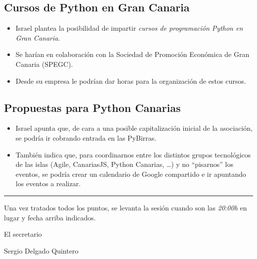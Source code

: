 \documentclass[a4paper, 12pt]{article}
\begin{document}
\subsection*{Cursos de Python en Gran Canaria}

\begin{itemize}
    \item Israel plantea la posibilidad de impartir \textit{cursos de programación Python en Gran Canaria}.
    \item Se harían en colaboración con la Sociedad de Promoción Económica de Gran Canaria (SPEGC).
    \item Desde su empresa le podrían dar horas para la organización de estos cursos.
\end{itemize}

\subsection*{Propuestas para Python Canarias}

\begin{itemize}
    \item Israel apunta que, de cara a una posible capitalización inicial de la asociación, se podría ir cobrando entrada en las PyBirras.
    \item También indica que, para coordinarnos entre los distintos grupos tecnológicos de las islas (Agile, CanariasJS, Python Canarias, \ldots) y no ``pisarnos'' los eventos, se podría crear un calendario de Google compartido e ir apuntando los eventos a realizar.
\end{itemize}



\vspace{1cm}
\hrule
\vspace{3mm}

Una vez tratados todos los puntos, se levanta la sesión cuando son las \textit{20:00h} en lugar y fecha arriba indicados.

\begin{flushright}
El secretario

Sergio Delgado Quintero
\end{flushright}
\end{document}
